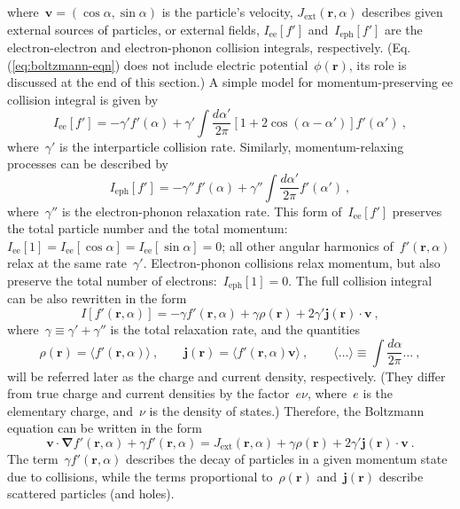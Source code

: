 \documentclass[preprint,aps,eqsecnum]{revtex4-1}
\begin{document}
where~${\bm v} = (\cos\alpha, \sin\alpha)$ is the particle's velocity,
$J_\mathrm{ext}({\bm r}, \alpha)$ describes given external sources
of particles, or external fields, $I_\mathrm{ee}[f']$
and~$I_\mathrm{eph}[f']$ are the electron-electron and
electron-phonon collision integrals, respectively.
(Eq.(\ref{eq:boltzmann-eqn}) does not include electric
potential~$\phi({\bm r})$,
its role is discussed at the end of this section.)
A simple model for momentum-preserving ee collision integral is given
by~\cite{Molenkamp}
\begin{equation}
I_\mathrm{ee}[f'] = - \gamma' f'(\alpha)
  + \gamma' \int \frac{d\alpha'}{2\pi}
  \left[1 + 2 \cos(\alpha - \alpha') \right] f'(\alpha')
\ ,
\end{equation}
where~$\gamma'$ is the interparticle collision rate.
Similarly, momentum-relaxing processes can be described by
\begin{equation}
I_\mathrm{eph}[f'] = - \gamma'' _\mathrm{} f'(\alpha)
  + \gamma'' \int \frac{d\alpha'}{2\pi} f'(\alpha')
\ ,
\end{equation}
where~$\gamma''$ is the electron-phonon relaxation rate. 
This form of~$I_\mathrm{ee}[f']$ 
preserves the total particle number
and the total momentum:
$I_\mathrm{ee}[1] = I_\mathrm{ee}[\cos\alpha] = I_\mathrm{ee}[\sin\alpha] = 0$;
all other angular harmonics of~$f'({\bm r}, \alpha)$
relax at the same rate~$\gamma'$.
Electron-phonon collisions relax momentum, but also preserve
the total number of electrons:~$I_\mathrm{eph}[1] = 0$.
The full collision integral can be also rewritten
in the form
\begin{equation}
  \label{eq:collision-integral}
  I[f'({\bm r}, \alpha)] = -\gamma f'({\bm r}, \alpha)
  + \gamma \rho({\bm r}) + 2 \gamma' {\bm j}({\bm r}) \cdot {\bm v}
 \ , 
\end{equation}
where~$\gamma \equiv \gamma' + \gamma''$ is the total relaxation
rate, and the quantities
\begin{equation}
  \label{eq:rho-and-j}
  \rho({\bm r}) = \langle f'({\bm r}, \alpha) \rangle
  \ , \qquad
  {\bm j}({\bm r}) = \langle f'({\bm r}, \alpha) {\bm v} \rangle
  \ , \qquad
  \langle \dots \rangle \equiv \int \frac{d\alpha}{2\pi} \dots
  \ ,
\end{equation}
will be referred later as the charge and current density, respectively.
(They differ from true charge and current densities by the factor~$e \nu$,
where~$e$ is the elementary charge, and~$\nu$ is the density of states.)
Therefore, the Boltzmann equation can be written in the form
\begin{equation}
  \label{eq:boltzmann-main}
  {\bm v} \cdot{\bm \nabla }f'({\bm r}, \alpha) + \gamma f'({\bm r}, \alpha) =
  J_\mathrm{ext}({\bm r}, \alpha) + \gamma \rho({\bm r})
  + 2 \gamma' {\bm j}({\bm r}) \cdot {\bm v}
  \ .
\end{equation}
The term~$\gamma f'(\bm r, \alpha)$
describes the decay of particles in a given momentum state due to collisions,
while the terms proportional to~$\rho({\bm r})$ and~${\bm j}({\bm r})$
describe scattered particles (and holes).
\end{document}
